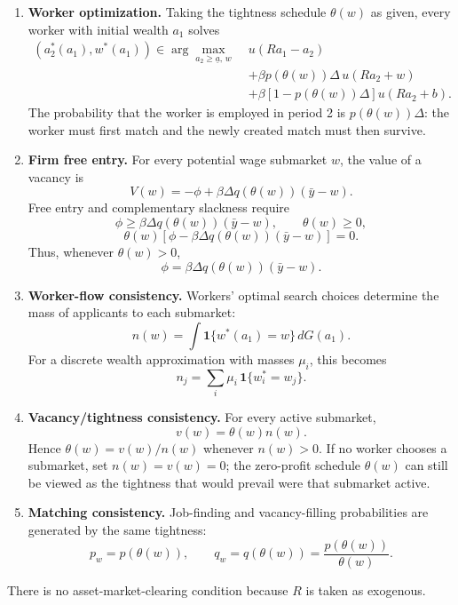 \documentclass[11pt]{article}
\newcommand{\1}{\mathbf{1}}
\begin{document}
\begin{enumerate}[label=\textbf{\arabic*.},leftmargin=*]

\item \textbf{Worker optimization.} Taking the tightness schedule $\theta(w)$ as given, every worker with initial wealth $a_1$ solves
\[
\begin{split}
\left(a_2^*(a_1),w^*(a_1)\right) \in
\arg\max_{a_2\geq \underline a,\,w}\; &u(Ra_1-a_2) \\
&+\beta p(\theta(w))\Delta\,u(Ra_2+w)\\
&+\beta\left[1-p(\theta(w))\Delta\right]u(Ra_2+b).
\end{split}
\tag{W}
\]
The probability that the worker is employed in period 2 is $p(\theta(w))\Delta$: the worker must first match and the newly created match must then survive.

\item \textbf{Firm free entry.} For every potential wage submarket $w$, the value of a vacancy is
\[
V(w)=-\phi+\beta\Delta q(\theta(w))(\bar y-w).
\]
Free entry and complementary slackness require
\[
\phi \geq \beta\Delta q(\theta(w))(\bar y-w), \qquad \theta(w)\geq 0,
\]
\[
\theta(w)\left[\phi-\beta\Delta q(\theta(w))(\bar y-w)\right]=0.
\tag{FE}
\]
Thus, whenever $\theta(w)>0$,
\[
\phi=\beta\Delta q(\theta(w))(\bar y-w).
\]

\item \textbf{Worker-flow consistency.} Workers' optimal search choices determine the mass of applicants to each submarket:
\[
n(w)=\int \1\{w^*(a_1)=w\}\,dG(a_1).
\tag{C1}
\]
For a discrete wealth approximation with masses $\mu_i$, this becomes
\[
n_j=\sum_i \mu_i\,\1\{w_i^*=w_j\}.
\]

\item \textbf{Vacancy/tightness consistency.} For every active submarket,
\[
v(w)=\theta(w)n(w).
\tag{C2}
\]
Hence $\theta(w)=v(w)/n(w)$ whenever $n(w)>0$. If no worker chooses a submarket, set $n(w)=v(w)=0$; the zero-profit schedule $\theta(w)$ can still be viewed as the tightness that would prevail were that submarket active.

\item \textbf{Matching consistency.} Job-finding and vacancy-filling probabilities are generated by the same tightness:
\[
p_w=p(\theta(w)), \qquad q_w=q(\theta(w))=\frac{p(\theta(w))}{\theta(w)}.
\tag{C3}
\]

\end{enumerate}

There is no asset-market-clearing condition because $R$ is taken as exogenous.
\end{document}
